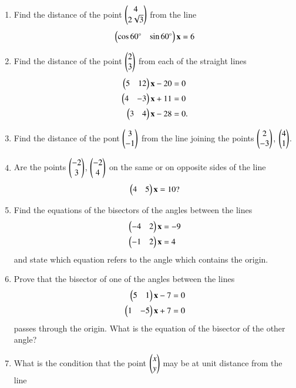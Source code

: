 \renewcommand{\theequation}{\theenumi}
\begin{enumerate}[label=\arabic*.,ref=\thesubsection.\theenumi]
\item Find the distance of the point $\begin{pmatrix}4\\2\sqrt{3}\end{pmatrix}$ from the line 
\begin{equation}
\begin{pmatrix}\cos 60\degree &  \sin 60\degree\end{pmatrix}\mathbf{x} = 6
\end{equation}
\item Find the distance of the point $\begin{pmatrix}2\\3\end{pmatrix}$ from each of the straight lines 
\begin{align}
\begin{pmatrix}5&12\end{pmatrix}\mathbf{x}-20&=0
\\
 \begin{pmatrix}4&-3\end{pmatrix}\mathbf{x}+11&=0
\\
 \begin{pmatrix}3 & 4\end{pmatrix}\mathbf{x}-28&=0.
\end{align}
\renewcommand{\theequation}{\theenumi}
\item Find the distance of the pont $\begin{pmatrix}3\\-1\end{pmatrix}$ from the line joining the points $\begin{pmatrix}2\\-3\end{pmatrix}$, $\begin{pmatrix}4\\1\end{pmatrix}$.
\item Are the points $\begin{pmatrix}-2\\3\end{pmatrix}$, $\begin{pmatrix}-2\\4\end{pmatrix}$ on the same or on opposite sides of the line
\begin{align}
\begin{pmatrix}4 &5\end{pmatrix} \mathbf{x}= 10?
\end{align}
\item Find the equations of the bisectors of the angles between the lines
\begin{align}
\begin{pmatrix}-4 &2\end{pmatrix}\mathbf{x}&=-9
\\
\begin{pmatrix}-1 & 2\end{pmatrix}\mathbf{x}&= 4
\end{align}
and state which equation refers to the angle which contains the origin.
\item Prove that the bisector of one of the angles between the lines
\begin{align}
\begin{pmatrix}5&1\end{pmatrix}\mathbf{x}-7 &= 0
\\
\begin{pmatrix}1 & -5\end{pmatrix}\mathbf{x}+7 &= 0
\end{align}
passes through the origin.  What is the equation of the bisector of the other angle?
\renewcommand{\theequation}{\theenumi}
\item What is the condition that the point $\begin{pmatrix}x\\y\end{pmatrix}$ may be at unit distance from the line

\end{enumerate}
